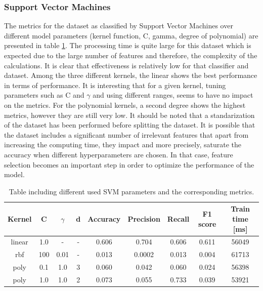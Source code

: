\documentclass{article}
\begin{document}
\subsubsection*{Support Vector Machines}
The metrics for the dataset as classified by Support Vector Machines over different model parameters (kernel function, C, gamma, degree of polynomial) are presented in table \ref{table:reviews_SVM}. The processing time is quite large for this dataset which is expected due to the large number of features and therefore, the complexity of the calculations. It is clear that effectiveness is relatively low for that classifier and dataset. Among the three different kernels, the linear shows the best performance in terms of performance. It is interesting that for a given kernel, tuning parameters such as C and $\gamma$ and using different ranges, seems to have no impact on the metrics. For the polynomial kernels, a second degree shows the highest metrics, however they are still very low. It should be noted that a standarization of the dataset has been performed before splitting the dataset. It is possible that the dataset includes a significant number of irrelevant features that apart from increasing the computing time, they impact and more precisely, saturate the accuracy when different hyperparameters are chosen. In that case, feature selection becomes an important step in order to optimize the performance of the model. 
\begin{table}[h!]
\centering
\begin{tabular}{||c c c c c c c c c||} 
 \hline
 Kernel & C & $\gamma$ &d & Accuracy & Precision & Recall & F1 score & Train time [ms]\\ [0.5ex] 
 \hline\hline
 linear & 1.0 & - & - & 0.606 & 0.704 & 0.606 & 0.611 &56049\\ 
 rbf & 100 & 0.01 & - & 0.013 & 0.0002 & 0.013 & 0.004 & 61713\\
 poly & 0.1 &  1.0 & 3 & 0.060 & 0.042 & 0.060 & 0.024 & 56398\\
 poly & 1.0 &  1.0&  2 & 0.073 & 0.055 & 0.733 & 0.039& 53921 \\ [1ex] 
 \hline
\end{tabular}
\caption{Table including different used SVM parameters and the corresponding metrics.}
\label{table:reviews_SVM}
\end{table}
\\
\end{document}
